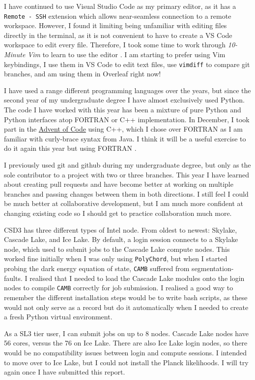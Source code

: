 \documentclass{article}
\begin{document}
I have continued to use Visual Studio Code as my primary editor, as it has a \texttt{Remote - SSH} extension which allows near-seamless connection to a remote workspace. However, I found it limiting being unfamiliar with editing files directly in the terminal, as it is not convenient to have to create a VS Code workspace to edit every file. Therefore, I took some time to work through \textit{10-Minute Vim} to learn to use the editor \cite{vim}. I am starting to prefer using Vim keybindings, I use them in VS Code to edit text files, use \texttt{vimdiff} to compare git branches, and am using them in Overleaf right now!

I have used a range different programming languages over the years, but since the second year of my undergraduate degree I have almost exclusively used Python. The code I have worked with this year has been a mixture of pure Python and Python interfaces atop FORTRAN or C++ implementation. In December, I took part in the \href{https://adventofcode.com}{Advent of Code} using C++, which I chose over FORTRAN as I am familiar with curly-brace syntax from Java. I think it will be a useful exercise to do it again this year but using FORTRAN \cite{advent}. 

I previously used git and github during my undergraduate degree, but only as the sole contributor to a project with two or three branches. This year I have learned about creating pull requests and have become better at working on multiple branches and passing changes between them in both directions. I still feel I could be much better at collaborative development, but I am much more confident at changing existing code so I should get to practice collaboration much more.

CSD3 has three different types of Intel node. From oldest to newest: Skylake, Cascade Lake,  and Ice Lake. By default, a login session connects to a Skylake node, which used to submit jobs to the Cascade Lake compute nodes. This worked fine initially when I was only using \texttt{PolyChord}, but when I started probing the dark energy equation of state, \texttt{CAMB} suffered from segmentation-faults. I realised that I needed to load the Cascade Lake modules onto the login nodes to compile \texttt{CAMB} correctly for job submission. I realised a good way to remember the different installation steps would be to write bash scripts, as these would not only serve as a record but do it automatically when I needed to create a fresh Python virtual environment.

As a SL3 tier user, I can submit jobs on up to 8 nodes. Cascade Lake nodes have 56 cores, versus the 76 on Ice Lake. There are also Ice Lake login nodes, so there would be no compatibility issues between login and compute sessions. I intended to move over to Ice Lake, but I could not install the Planck likelihoods. I will try again once I have submitted this report.
\end{document}
